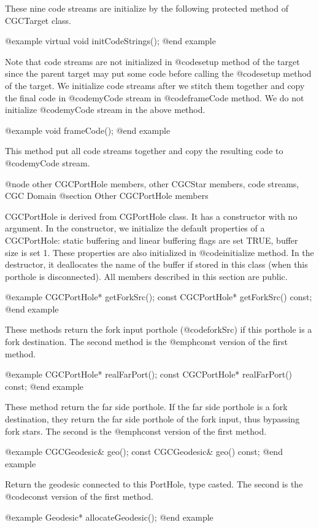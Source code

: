{These nine code streams are initialize by the following protected method
of CGCTarget class.

@example
virtual void initCodeStrings();
@end example

Note that code streams are not initialized in @code{setup} method of 
the target since the parent target may put some code before calling
the @code{setup} method of the target. We initialize code streams after
we stitch them together and copy the final code in @code{myCode} stream
in @code{frameCode} method. We do not initialize @code{myCode} stream in
the above method.

@example
void frameCode();
@end example

This method put all code streams together and copy the resulting code to
@code{myCode} stream. 

@node other CGCPortHole members, other CGCStar members, code streams, CGC Domain
@section Other CGCPortHole members

CGCPortHole is derived from CGPortHole class. It has a constructor with no
argument. In the constructor, we initialize the default properties of a
CGCPortHole: static buffering and linear buffering flags are set TRUE, buffer
size is set 1. These properties are also initialized in @code{initialize}
method. In the destructor, it deallocates the name of the buffer if stored
in this class (when this porthole is disconnected). All members described in
this section are public.

@example
CGCPortHole* getForkSrc();
const CGCPortHole* getForkSrc() const;
@end example

These methods return the fork input porthole (@code{forkSrc}) if this porthole
is a fork destination. The second method is the @emph{const} version of the 
first method.

@example
CGCPortHole* realFarPort();
const CGCPortHole* realFarPort() const;
@end example

These method return the far side porthole. If the far side porthole is a fork
destination, they return the far side porthole of the fork input, thus
bypassing fork stars. The second is the @emph{const} version of the 
first method.

@example
CGCGeodesic& geo();
const CGCGeodesic& geo() const;
@end example

Return the geodesic connected to this PortHole, type casted. The second 
is the @code{const} version of the first method.

@example
Geodesic* allocateGeodesic();
@end example

}
